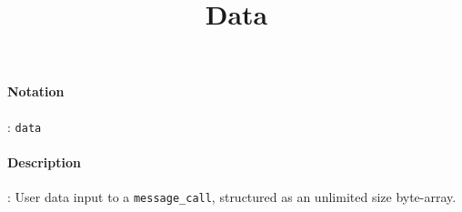 \documentclass[10pt,a4paper,oneside]{scrartcl}
\author{}
\title{Data}
\date{}
\begin{document}
\maketitle
\paragraph{Notation}: \texttt{data}
\paragraph{Description}: User data input to a \texttt{message\_call}, structured as an unlimited size byte-array.
\end{document}
